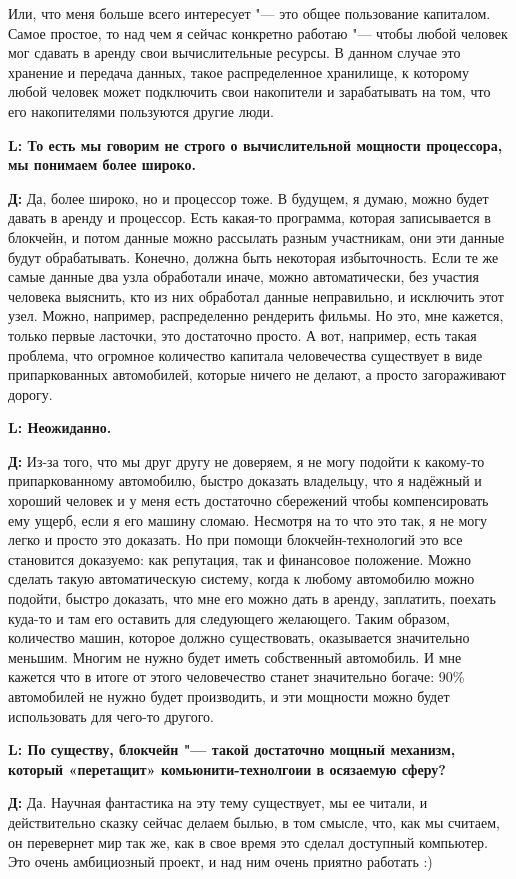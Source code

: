 \documentclass[10pt, a5paper]{article}
\begin{document}
Или, что меня больше всего интересует "--- это общее пользование капиталом. Самое простое, то над чем я сейчас конкретно работаю "--- чтобы любой человек мог сдавать в аренду свои вычислительные ресурсы. В данном случае это хранение и передача данных,  такое распределенное хранилище, к которому любой человек может подключить свои накопители и зарабатывать на том, что его накопителями пользуются другие люди.

{\noindent \bf L: То есть мы говорим не строго о вычислительной мощности процессора, мы понимаем более широко.}

{\noindent \bf Д:} Да, более широко, но и процессор тоже. В будущем, я думаю, можно будет давать в аренду и процессор. Есть какая-то программа, которая записывается в блокчейн, и потом данные можно рассылать разным участникам, они эти данные будут обрабатывать. Конечно, должна быть некоторая избыточность. Если те же  самые данные два узла обработали иначе, можно автоматически, без участия человека выяснить, кто из них обработал данные неправильно, и исключить этот узел. Можно, например, распределенно рендерить фильмы. Но это, мне кажется, только первые ласточки, это достаточно просто. А вот, например, есть такая проблема, что огромное количество капитала человечества существует в виде припаркованных автомобилей, которые ничего не делают, а просто загораживают дорогу.

{\noindent \bf L: Неожиданно.}

{\noindent \bf Д:} Из-за того, что мы друг другу не доверяем, я не могу подойти к какому-то припаркованному автомобилю, быстро доказать владельцу, что я надёжный и хороший человек и у меня есть достаточно сбережений чтобы компенсировать ему ущерб, если я его машину сломаю. Несмотря на то что это так, я не могу легко и просто это доказать. Но при помощи блокчейн-технологий это все становится доказуемо: как репутация, так и финансовое положение. Можно сделать такую автоматическую систему, когда к любому автомобилю можно подойти, быстро доказать, что мне его можно дать в аренду, заплатить, поехать куда-то и там его оставить для следующего желающего. Таким образом, количество машин, которое должно существовать, оказывается значительно меньшим. Многим не нужно будет иметь собственный автомобиль. И мне кажется что в итоге от этого человечество станет значительно богаче:  90\% автомобилей не нужно будет производить, и эти мощности можно будет использовать для чего-то другого.

{\noindent \bf L: По существу, блокчейн "--- такой достаточно мощный механизм, который «перетащит» комьюнити-технолгоии в \linebreak осязаемую сферу?}

{\noindent \bf Д:} Да. Научная фантастика на эту тему существует, мы ее читали, и действительно сказку сейчас делаем былью, в том смысле, что, как мы  считаем, он перевернет мир так же, как в свое время это сделал доступный компьютер. Это очень амбициозный проект, и над ним очень приятно работать :)

 
\end{document}
